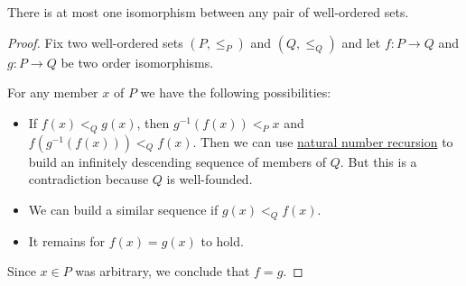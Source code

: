 \begin{proposition}\label{thm:well_ordered_isomorphism_is_unique}
  There is at most one isomorphism between any pair of well-ordered sets.
\end{proposition}
\begin{proof}
  Fix two well-ordered sets \( (P, \leq_P) \) and \( (Q, \leq_Q) \) and let \( f: P \to Q \) and \( g: P \to Q \) be two order isomorphisms.

  For any member \( x \) of \( P \) we have the following possibilities:
  \begin{itemize}
    \item If \( f(x) <_Q g(x) \), then \( g^{-1}(f(x)) <_P x \) and \( f(g^{-1}(f(x))) <_Q f(x) \). Then we can use \hyperref[rem:natural_number_recursion]{natural number recursion} to build an infinitely descending sequence of members of \( Q \). But this is a contradiction because \( Q \) is well-founded.

    \item We can build a similar sequence if \( g(x) <_Q f(x) \).

    \item It remains for \( f(x) = g(x) \) to hold.
  \end{itemize}

  Since \( x \in P \) was arbitrary, we conclude that \( f = g \).
\end{proof}

